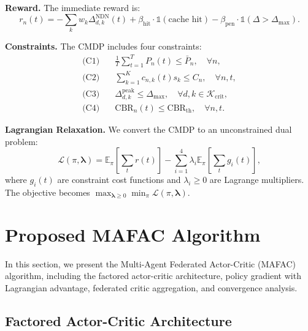 \documentclass[journal]{IEEEtran}
\begin{document}
\textbf{Reward.} The immediate reward is:
\begin{equation} \label{eq:reward}
r_n(t) = -\sum_{k} w_k \Delta_{d,k}^{\text{NDN}}(t) + \beta_{\text{hit}} \cdot \mathbb{1}(\text{cache hit}) - \beta_{\text{pen}} \cdot \mathbb{1}(\Delta > \Delta_{\max}).
\end{equation}

\textbf{Constraints.} The CMDP includes four constraints:
\begin{align}
\text{(C1)} &\quad \frac{1}{T}\sum_{t=1}^{T} P_n(t) \leq \bar{P}_n, \quad \forall n, \label{eq:c1} \\
\text{(C2)} &\quad \sum_{k=1}^{K} c_{n,k}(t) s_k \leq C_n, \quad \forall n, t, \label{eq:c2} \\
\text{(C3)} &\quad \Delta_{d,k}^{\text{peak}} \leq \Delta_{\max}, \quad \forall d, k \in \mathcal{K}_{\text{crit}}, \label{eq:c3} \\
\text{(C4)} &\quad \text{CBR}_n(t) \leq \text{CBR}_{\text{th}}, \quad \forall n, t. \label{eq:c4}
\end{align}

\textbf{Lagrangian Relaxation.} We convert the CMDP to an unconstrained dual problem:
\begin{equation} \label{eq:lagrangian}
\mathcal{L}(\pi, \boldsymbol{\lambda}) = \mathbb{E}_\pi\left[\sum_t r(t)\right] - \sum_{i=1}^{4} \lambda_i \mathbb{E}_\pi\left[\sum_t g_i(t)\right],
\end{equation}
where $g_i(t)$ are constraint cost functions and $\lambda_i \geq 0$ are Lagrange multipliers. The objective becomes $\max_{\boldsymbol{\lambda} \geq 0} \min_\pi \mathcal{L}(\pi, \boldsymbol{\lambda})$.

\section{Proposed MAFAC Algorithm} \label{sec.prop}

In this section, we present the Multi-Agent Federated Actor-Critic (MAFAC) algorithm, including the factored actor-critic architecture, policy gradient with Lagrangian advantage, federated critic aggregation, and convergence analysis.

\subsection{Factored Actor-Critic Architecture} \label{subsec:1}
\end{document}
